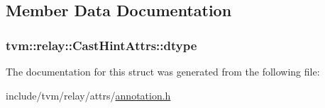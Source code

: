 \subsection{Member Data Documentation}
\subsubsection[{\texorpdfstring{dtype}{dtype}}]{ tvm\+::relay\+::\+Cast\+Hint\+Attrs\+::dtype}\hypertarget{structtvm_1_1relay_1_1CastHintAttrs_adb4985f72ebd0c28d85745b831258f78}{}\label{structtvm_1_1relay_1_1CastHintAttrs_adb4985f72ebd0c28d85745b831258f78}


The documentation for this struct was generated from the following file\+:\begin{DoxyCompactItemize}
\item 
include/tvm/relay/attrs/\hyperlink{annotation_8h}{annotation.\+h}\end{DoxyCompactItemize}

